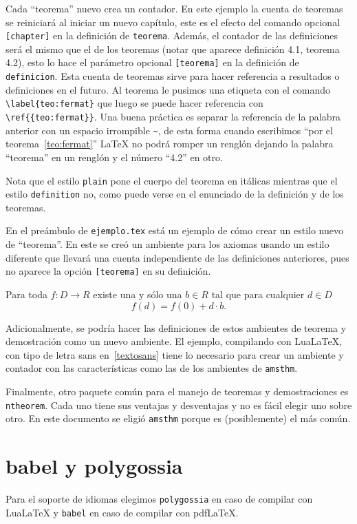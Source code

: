 Cada ``teorema'' nuevo crea un contador. En este ejemplo la cuenta de
teoremas se reiniciará al iniciar un nuevo capítulo, este es el efecto del
comando opcional \texttt{[chapter]} en la definición de \texttt{teorema}.
Además, el contador de las definiciones será el mismo que el de los teoremas
(notar que aparece definición 4.1, teorema 4.2), esto lo hace el parámetro
opcional \texttt{[teorema]} en la definición de \texttt{definicion}. Esta
cuenta de teoremas sirve para hacer referencia a resultados o definiciones
en el futuro. Al teorema le pusimos una etiqueta con el comando
\verb|\label{teo:fermat}| que luego se puede hacer referencia con
\verb|\ref{{teo:fermat}}|. Una buena práctica es separar la referencia de la
palabra anterior con un espacio irrompible \verb|~|, de esta forma cuando
escribimos ``por el teorema~\ref{teo:fermat}'' \LaTeX{} no podrá romper un
renglón dejando la palabra ``teorema'' en un renglón y el número ``4.2'' en
otro.

Nota que el estilo \texttt{plain} pone el cuerpo del teorema en itálicas
mientras que el estilo \texttt{definition} no, como puede verse en el
enunciado de la definición y de los teoremas.

En el preámbulo de \texttt{ejemplo.tex} está un ejemplo de cómo crear un
estilo nuevo de ``teorema''. En este se creó un ambiente para los axiomas
usando un estilo diferente que llevará una cuenta independiente de las
definiciones anteriores, pues no aparece la opción \texttt{[teorema]} en su
definición.

\begin{axioma}
  Para toda \(f\colon D\to R\) existe una y sólo una \(b\in R\) tal que para
  cualquier \(d\in D\)
  \[
    f(d)=f(0)+d\cdot b.
  \]
\end{axioma}

Adicionalmente, se podría hacer las definiciones de estos ambientes de
teorema y demostración como un nuevo ambiente. El ejemplo, compilando con
Lua\LaTeX, con tipo de letra sans en~\ref{textosans} tiene lo necesario para
crear un ambiente y contador con las características como las de los
ambientes de \texttt{amsthm}.

Finalmente, otro paquete común para el manejo de teoremas y demostraciones
es \texttt{ntheorem}. Cada uno tiene sus ventajas y desventajas y no es
fácil elegir uno sobre otro. En este documento se eligió \texttt{amsthm}
porque es (posiblemente) el más común.


\section{babel y polygossia}%
\label{sec:babel}
Para el soporte de idiomas elegimos \texttt{polygossia} en caso de compilar
con Lua\LaTeX{} y \texttt{babel} en caso de compilar con pdf\LaTeX.

